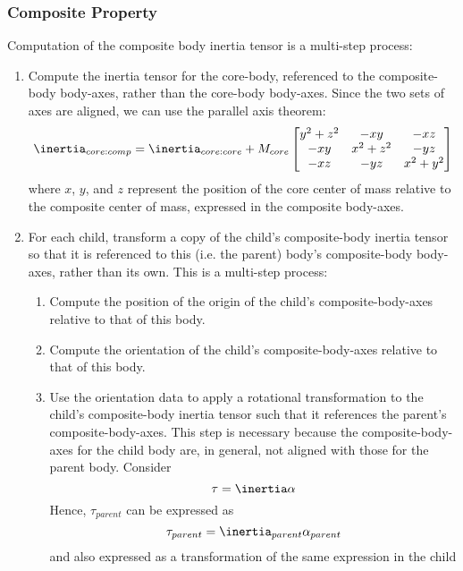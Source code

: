 \subsubsection {Composite Property}
Computation of the composite body inertia tensor is a multi-step process:
\begin{enumerate}
 \item Compute the inertia tensor for the core-body, referenced to the 
 composite-body body-axes, rather than the core-body body-axes.  Since the two 
 sets of axes are aligned, we can use the parallel axis theorem:
 \begin{equation}\label{eq:inertia_offset}
  \inertia_{core:comp} = \inertia_{core:core} + M_{core} \begin{bmatrix} y^2 + 
  z^2 & -xy & -xz \\-xy & x^2 + z^2 & -yz \\ -xz & -yz & x^2+y^2 \end{bmatrix}
 \end{equation}
 where $x$, $y$, and $z$ represent the position of the core center of mass 
 relative to the composite center of mass, expressed in the composite 
 body-axes.
 \item For each child, transform a copy of the child's composite-body inertia 
 tensor so that it is referenced to this (i.e. the parent) body's 
 composite-body body-axes, rather than its own.  This is a multi-step process:
 \begin{enumerate}
  \item Compute the position of the origin of the child's composite-body-axes 
  relative to that of this body.
  \item Compute the orientation of the child's composite-body-axes relative to 
  that of this body.
  \item Use the orientation data to apply a rotational transformation to the 
  child's composite-body inertia tensor such that it references the parent's 
  composite-body-axes.  This step is necessary because the composite-body-axes 
  for the child body are, in general, not aligned with those for the parent 
  body. Consider
  \begin{equation*}
   \tau = \inertia \alpha
  \end{equation*}
  Hence, $\tau_{parent}$ can be expressed as 
  \begin{equation*}
   \tau_{parent} = \inertia_{parent} \alpha_{parent}
  \end{equation*}
  and also expressed as a transformation of the same expression in the child 

\end{enumerate}
\end{enumerate}
